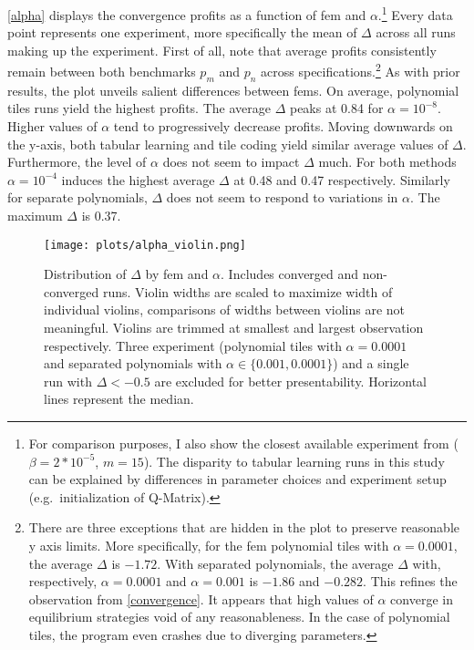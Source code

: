 \autoref{alpha} displays the convergence profits as a function of \gls{fem} and $\alpha$.\footnote{For comparison purposes, I also show the closest available experiment from \textcite{calvano_artificial_2020} ($\beta = 2*10^{-5}$, $m = 15$). The disparity to tabular learning runs in this study can be explained by differences in parameter choices and experiment setup (e.g.\ initialization of Q-Matrix).} Every data point represents one experiment, more specifically the mean of $\Delta$ across all runs making up the experiment. First of all, note that average profits consistently remain between both benchmarks $p_m$ and $p_n$ across specifications.\footnote{There are three exceptions that are hidden in the plot to preserve reasonable y axis limits. More specifically, for the \gls{fem} polynomial tiles with $\alpha = 0.0001$, the average $\Delta$ is $-1.72$. With separated polynomials, the average $\Delta$ with, respectively, $\alpha = 0.0001$ and $\alpha = 0.001$ is $-1.86$ and $-0.282$. This refines the observation from \autoref{convergence}. It appears that high values of $\alpha$ converge in equilibrium strategies void of any reasonableness. In the case of polynomial tiles, the program even crashes due to diverging parameters.} As with prior results, the plot unveils salient differences between \gls{fem}s. On average, polynomial tiles runs yield the highest profits. The average $\Delta$ peaks at 0.84 for $\alpha = 10^{-8}$. Higher values of $\alpha$ tend to progressively decrease profits. Moving downwards on the y-axis, both tabular learning and tile coding yield similar average values of $\Delta$. Furthermore, the level of $\alpha$ does not seem to impact $\Delta$ much. For both methods $\alpha = 10^{-4}$ induces the highest average $\Delta$ at 0.48 and 0.47 respectively. Similarly for separate polynomials, $\Delta$ does not seem to respond to variations in $\alpha$. The maximum $\Delta$ is 0.37.

\begin{figure}
	\texttt{[image: plots/alpha\_violin.png]}
	\caption[Distribution of $\Delta$ by \gls{fem} and $\alpha$]{Distribution of $\Delta$ by \gls{fem} and $\alpha$. Includes converged and non-converged runs. Violin widths are scaled to maximize width of individual violins, comparisons of widths between violins are not meaningful. Violins are trimmed at smallest and largest observation respectively. Three experiment (polynomial tiles with $\alpha = 0.0001$ and separated polynomials with $\alpha \in \{0.001, 0.0001\}$) and a single run with $\Delta < -0.5$ are excluded for better presentability. Horizontal lines represent the median.}
	\label{alpha_violin}
\end{figure}

